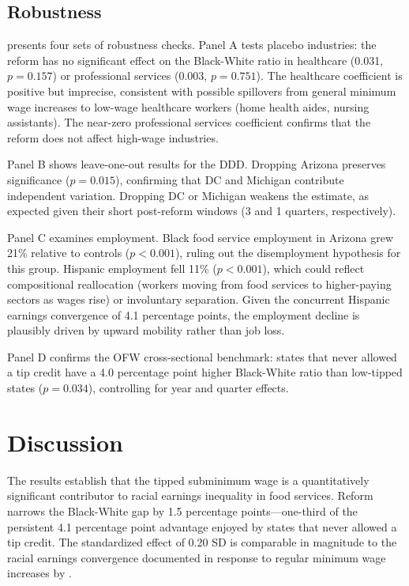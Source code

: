 \documentclass[12pt]{article}
\begin{document}
\subsection{Robustness}



 presents four sets of robustness checks. Panel A tests placebo industries: the reform has no significant effect on the Black-White ratio in healthcare (0.031, $p = 0.157$) or professional services (0.003, $p = 0.751$). The healthcare coefficient is positive but imprecise, consistent with possible spillovers from general minimum wage increases to low-wage healthcare workers (home health aides, nursing assistants). The near-zero professional services coefficient confirms that the reform does not affect high-wage industries.

Panel B shows leave-one-out results for the DDD. Dropping Arizona preserves significance ($p = 0.015$), confirming that DC and Michigan contribute independent variation. Dropping DC or Michigan weakens the estimate, as expected given their short post-reform windows (3 and 1 quarters, respectively).

Panel C examines employment. Black food service employment in Arizona grew 21\% relative to controls ($p < 0.001$), ruling out the disemployment hypothesis for this group. Hispanic employment fell 11\% ($p < 0.001$), which could reflect compositional reallocation (workers moving from food services to higher-paying sectors as wages rise) or involuntary separation. Given the concurrent Hispanic earnings convergence of 4.1 percentage points, the employment decline is plausibly driven by upward mobility rather than job loss.

Panel D confirms the OFW cross-sectional benchmark: states that never allowed a tip credit have a 4.0 percentage point higher Black-White ratio than low-tipped states ($p = 0.034$), controlling for year and quarter effects.

\section{Discussion}

The results establish that the tipped subminimum wage is a quantitatively significant contributor to racial earnings inequality in food services. Reform narrows the Black-White gap by 1.5 percentage points---one-third of the persistent 4.1 percentage point advantage enjoyed by states that never allowed a tip credit. The standardized effect of 0.20 SD is comparable in magnitude to the racial earnings convergence documented in response to regular minimum wage increases by \citet{derenoncourt2021minimum}.
\end{document}
